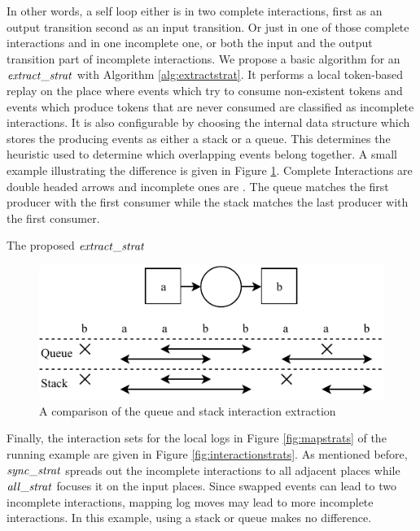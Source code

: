  In other words, a self loop either is in two complete interactions, first as an output transition second as an input transition. Or just in one of those complete interactions and in one incomplete one, or both the input and the output transition part of incomplete interactions.
 We propose a basic algorithm for an $\mathit{extract\_strat}$ with Algorithm \ref{alg:extractstrat}. It performs a local token-based replay on the place where events which try to consume non-existent tokens and events which produce tokens that are never consumed are classified as incomplete interactions. It is also configurable by choosing the internal data structure which stores the producing events as either a stack or a queue. This determines the heuristic used to determine which overlapping events belong together. A small example illustrating the difference is given in Figure \ref{fig:stackqueue}. Complete Interactions are double headed arrows and incomplete ones are \texttimes. The queue matches the first producer with the first consumer while the stack matches the last producer with the first consumer.
\begin{algorithm}

\caption{The proposed $\mathit{extract\_strat}$}
\label{alg:extractstrat}
\end{algorithm}
\begin{figure}
    \centering
    \includegraphics[scale=1]{figures/concept/overlap_strategy.pdf}
    \caption{A comparison of the queue and stack interaction extraction}
    \label{fig:stackqueue}
\end{figure}

Finally, the interaction sets for the local logs in Figure \ref{fig:mapstrats} of the running example are given in Figure \ref{fig:interactionstrats}. As mentioned before, $\mathit{sync\_strat}$ spreads out the incomplete interactions to all adjacent places while $\mathit{all\_strat}$ focuses it on the input places. Since swapped events can lead to two incomplete interactions, mapping log moves may lead to more incomplete interactions. In this example, using a stack or queue makes no difference.

